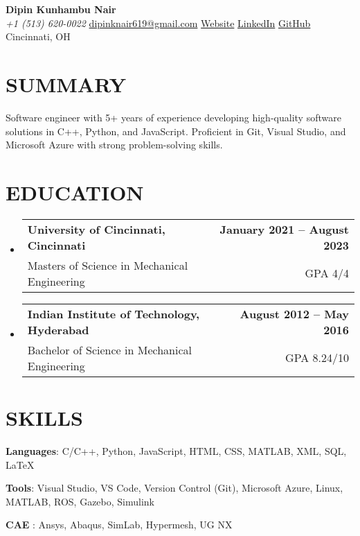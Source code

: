 \documentclass[letterpaper,11pt]{article}
\makeatletter
\newcommand{\resumeSubheading}[4]{
  \vspace{-2pt}\item
    \begin{tabular*}{1.0\textwidth}[t]{l@{\extracolsep{\fill}}r}
      \textbf{{#1}} & \textbf{{\small #2}} \\
      
      {#3} & {\small #4} \\
    \end{tabular*}\vspace{-4pt}
}
\newcommand{\resumeSubHeadingListStart}{\begin{itemize}[leftmargin=0.0in, label={}]}
\newcommand{\resumeSubHeadingListEnd}{\end{itemize}}
\makeatother
\begin{document}
\begin{center}
  {\huge \textbf{Dipin Kunhambu Nair}} \\
  \small \emph{+1 (513) 620-0022} \textbullet \href{mailto:dipinknair619@gmail.com}{dipinknair619@gmail.com}
  \textbullet
   \href{https://dipinknair.github.io/}{Website}
  \href{https://linkedin.com/in/dipinknair619/}{LinkedIn} 
  \textbullet
  \href{https://github.com/dipinknair}{GitHub} 
  \textbullet
  Cincinnati, OH \\
  \vspace{-10pt}
\end{center}

\vspace{-20pt}
\section{SUMMARY}
{Software engineer with 5+ years of experience developing high-quality software solutions in C++, Python, and JavaScript. Proficient in Git, Visual Studio, and Microsoft Azure with strong problem-solving skills.}
\vspace{-10pt}
\section{EDUCATION}
  \resumeSubHeadingListStart
    \resumeSubheading
      {University of Cincinnati, Cincinnati}{January 2021 -- August 2023}
      {Masters of Science in Mechanical Engineering}{GPA 4/4}
  \resumeSubHeadingListEnd
  \vspace{-15pt}
  \resumeSubHeadingListStart
    \resumeSubheading
      {Indian Institute of Technology, Hyderabad}{August 2012 -- May 2016}
      {Bachelor of Science in Mechanical Engineering}{GPA 8.24/10}
  \resumeSubHeadingListEnd
\vspace{-15pt}

\section{SKILLS}
 \begin{itemize}[leftmargin=0.2in]
    \small{\item{
     \textbf{Languages}{: C/C++, Python, JavaScript, HTML, CSS, MATLAB, XML, SQL, \LaTeX }
     \vspace{-5pt}
     \item{\textbf{Tools}{: Visual Studio, VS Code, Version Control (Git), Microsoft Azure, Linux, MATLAB, ROS, Gazebo, Simulink}}
     \vspace{-5pt}
     \item{\textbf{CAE  }{: Ansys, Abaqus, SimLab, Hypermesh, UG NX}}
    }}
 \end{itemize}
 \vspace{-18pt}
\end{document}
